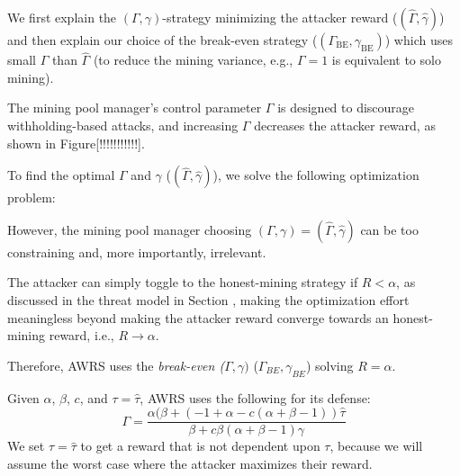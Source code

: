 \documentclass[runningheads]{llncs}
\begin{document}
We first explain the $(\Gamma,\gamma)$-strategy minimizing the attacker reward ($(\hat{\Gamma},\hat{\gamma})$) and then explain our choice of the break-even strategy ($(\Gamma_{\mbox{BE}},\gamma_{\mbox{BE}})$) which uses small $\Gamma$ than $\hat{\Gamma}$ (to reduce the mining variance, e.g., $\Gamma=1$ is equivalent to solo mining). 


The mining pool manager's control parameter $\Gamma$ is designed to discourage withholding-based attacks, and increasing $\Gamma$ decreases the attacker reward, as shown in Figure[!!!!!!!!!!!]. 

To find the optimal $\Gamma$ and $\gamma$ ($(\hat{\Gamma},\hat{\gamma})$), we solve the following optimization problem: 









However, the mining pool manager choosing $(\Gamma,\gamma) = (\hat{\Gamma},\hat{\gamma})$ can be too constraining and, more importantly, irrelevant. 

The attacker can simply toggle to the honest-mining strategy if $R < \alpha$, as discussed in the threat model in Section%
, making the optimization effort meaningless beyond making the attacker reward converge towards an honest-mining reward, i.e., $R \rightarrow \alpha$. 

Therefore, AWRS uses the \emph{break-even ($\Gamma,\gamma)$} ($\Gamma_{BE},\gamma_{BE}$) solving $R = \alpha$. 

Given $\alpha$, $\beta$, $c$, and $\tau = \hat{\tau}$, AWRS uses the following for its defense:
\begin{equation}
\Gamma=\frac{ \alpha(\beta+(-1+\alpha-c(\alpha+\beta-1))\hat{\tau}}{ \beta+c\beta(\alpha+\beta-1)\gamma}
\end{equation}
We set $\tau=\hat{\tau}$ to get a reward that is not dependent upon $\tau$, because we will assume the worst case where the attacker maximizes their reward.
\end{document}
